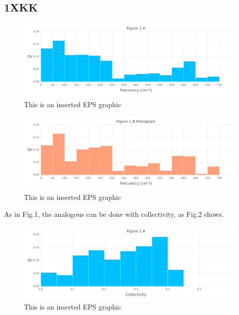 \documentclass[10pt,letterpaper]{article}
\begin{document}
\FloatBarrier
\newpage

\subsection{1XKK}

\begin{figure}[ht]
\begin{center}
\includegraphics[scale=0.5]{1xkk/1afigure_hi-precision.pdf}
\caption{This is an inserted EPS graphic}
\label{fig1}
\end{center}
\end{figure}

\begin{figure}[ht]
\begin{center}
\includegraphics[scale=0.5]{1xkk/1bfigure_hi-precision.pdf}
\caption{This is an inserted EPS graphic}
\label{fig2}
\end{center}
\end{figure}

\clearpage
As in Fig.1, the analogous can be done with collectivity, as Fig.2 shows.

\begin{figure}[ht]
\begin{center}
\includegraphics[scale=0.5]{1xkk/2afigure_hi-precision.pdf}
\caption{This is an inserted EPS graphic}
\label{fig3}
\end{center}
\end{figure}
\end{document}
